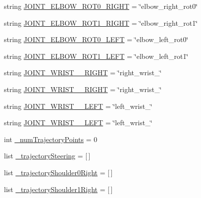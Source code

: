 \begin{DoxyCompactItemize}
\item 
string \mbox{\hyperlink{namespaceinterpolate__steering_a1003201706f255d9ba0bc7f20e13f9c3}{J\+O\+I\+N\+T\+\_\+\+E\+L\+B\+O\+W\+\_\+\+R\+O\+T0\+\_\+\+R\+I\+G\+HT}} = \char`\"{}elbow\+\_\+right\+\_\+rot0\char`\"{}
\item 
string \mbox{\hyperlink{namespaceinterpolate__steering_ace1f95b51b65bc8e9ed73b36ca2d0ed9}{J\+O\+I\+N\+T\+\_\+\+E\+L\+B\+O\+W\+\_\+\+R\+O\+T1\+\_\+\+R\+I\+G\+HT}} = \char`\"{}elbow\+\_\+right\+\_\+rot1\char`\"{}
\item 
string \mbox{\hyperlink{namespaceinterpolate__steering_aa56ce7547e622887af8e60fbcd449606}{J\+O\+I\+N\+T\+\_\+\+E\+L\+B\+O\+W\+\_\+\+R\+O\+T0\+\_\+\+L\+E\+FT}} = \char`\"{}elbow\+\_\+left\+\_\+rot0\char`\"{}
\item 
string \mbox{\hyperlink{namespaceinterpolate__steering_a779d7b9dcfe9d5b0b820602be6aa2e66}{J\+O\+I\+N\+T\+\_\+\+E\+L\+B\+O\+W\+\_\+\+R\+O\+T1\+\_\+\+L\+E\+FT}} = \char`\"{}elbow\+\_\+left\+\_\+rot1\char`\"{}
\item 
string \mbox{\hyperlink{namespaceinterpolate__steering_ad5a4be83bfb46071da6a4385ed085b46}{J\+O\+I\+N\+T\+\_\+\+W\+R\+I\+S\+T\+\_\+\_\+\+R\+I\+G\+HT}} = \char`\"{}right\+\_\+wrist\+\_\char`\"{}
\item 
string \mbox{\hyperlink{namespaceinterpolate__steering_afdefe6908b524302476a151bf143d3fd}{J\+O\+I\+N\+T\+\_\+\+W\+R\+I\+S\+T\+\_\+\_\+\+R\+I\+G\+HT}} = \char`\"{}right\+\_\+wrist\+\_\char`\"{}
\item 
string \mbox{\hyperlink{namespaceinterpolate__steering_a5025346201609032c153c1ad6c7ba0be}{J\+O\+I\+N\+T\+\_\+\+W\+R\+I\+S\+T\+\_\+\_\+\+L\+E\+FT}} = \char`\"{}left\+\_\+wrist\+\_\char`\"{}
\item 
string \mbox{\hyperlink{namespaceinterpolate__steering_a75d5cbcdcce19f0d3902243d41791859}{J\+O\+I\+N\+T\+\_\+\+W\+R\+I\+S\+T\+\_\+\_\+\+L\+E\+FT}} = \char`\"{}left\+\_\+wrist\+\_\char`\"{}
\item 
int \mbox{\hyperlink{namespaceinterpolate__steering_a43f4dccede1c7081ce555c5bfd145f4f}{\+\_\+num\+Trajectory\+Points}} = 0
\item 
list \mbox{\hyperlink{namespaceinterpolate__steering_af04f76e773027d8404395f6a76a61d08}{\+\_\+trajectory\+Steering}} = \mbox{[}$\,$\mbox{]}
\item 
list \mbox{\hyperlink{namespaceinterpolate__steering_af686539c8dfd7bfc045576bb2ac92fa5}{\+\_\+trajectory\+Shoulder0\+Right}} = \mbox{[}$\,$\mbox{]}
\item 
list \mbox{\hyperlink{namespaceinterpolate__steering_a763504de1e0e3bc8be3656e07acd874d}{\+\_\+trajectory\+Shoulder1\+Right}} = \mbox{[}$\,$\mbox{]}

\end{DoxyCompactItemize}
